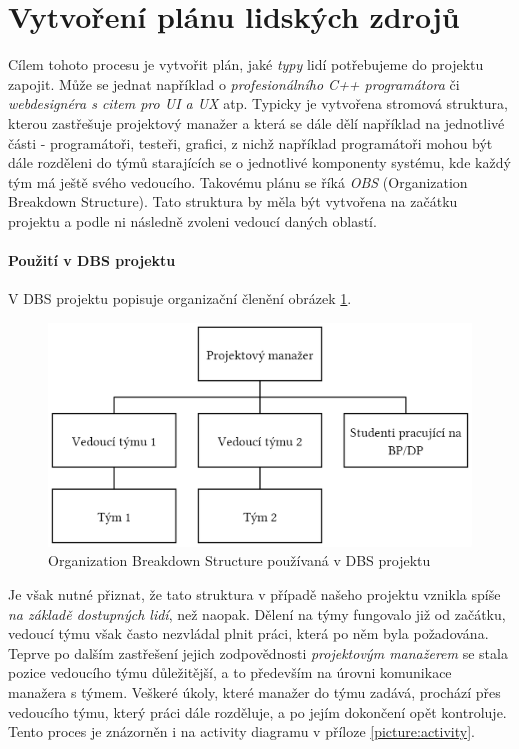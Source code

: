 
\section{Vytvoření plánu lidských zdrojů}

Cílem tohoto procesu je vytvořit plán, jaké \emph{typy} lidí potřebujeme do projektu zapojit. Může se jednat například o \emph{profesionálního C++ programátora} či \emph{webdesignéra s citem pro UI a UX} atp. Typicky je vytvořena stromová struktura, kterou zastřešuje projektový manažer a která se dále dělí například na jednotlivé části - programátoři, testeři, grafici, z nichž například programátoři mohou být dále rozděleni do týmů starajících se o jednotlivé komponenty systému, kde každý tým má ještě svého vedoucího. Takovému plánu se říká \emph{OBS} (Organization Breakdown Structure). Tato struktura by měla být vytvořena na začátku projektu a podle ni následně zvoleni vedoucí daných oblastí.

\paragraph{Použití v DBS projektu}
V DBS projektu popisuje organizační členění obrázek \ref{picture:obs}.
\begin{figure}[h]
\includegraphics[width=\textwidth]{../pdf/dbs-obs.pdf}
\caption{Organization Breakdown Structure používaná v DBS projektu} \label{picture:obs}
\end{figure}
Je však nutné přiznat, že tato struktura v případě našeho projektu vznikla spíše \emph{na základě dostupných lidí}, než naopak. Dělení na týmy fungovalo již od začátku, vedoucí týmu však často nezvládal plnit práci, která po něm byla požadována. Teprve po dalším zastřešení jejich zodpovědnosti \emph{projektovým manažerem} se stala pozice vedoucího týmu důležitější, a to především na úrovni komunikace manažera s týmem. Veškeré úkoly, které manažer do týmu zadává, prochází přes vedoucího týmu, který práci dále rozděluje, a po jejím dokončení opět kontroluje. Tento proces je znázorněn i na activity diagramu v příloze \ref{picture:activity}.

